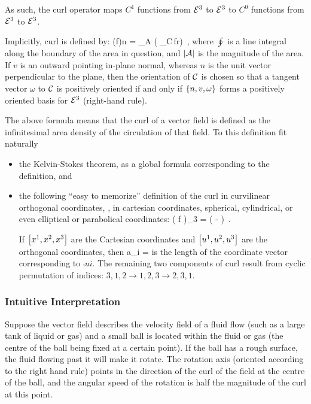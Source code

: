 As such, the curl operator maps $C^1$ functions from $\mathcal{E}^{3}$ to $\mathcal{E}^{3}$ to $C^0$ functions from $\mathcal{E}^{3}$ to $\mathcal{E}^{3}$.

Implicitly, curl is defined by:
\beq
(\gder\cprod f)\iprod n = \lim_{\surf A} \left(  \oint_{\curve C}\,f\iprod\dx r\right) \,,
\eeq
where $\oint$ is a line integral along the boundary of the area in question, and $\lvert{\mathcal{A}}\rvert$ is the magnitude of the area. If $v$ is an outward pointing in-plane normal, whereas $n$ is the unit vector perpendicular to the plane, then the orientation of $\mathcal{C}$ is chosen so that a tangent vector $\omega$ to $\mathcal{C}$ is positively oriented if and only if $\left\lbrace{n, v,\omega}\right\rbrace$ forms a positively oriented basis for $\mathcal{E}^{3}$ (right-hand rule).

The above formula means that the curl of a vector field is defined as the infinitesimal area density of the circulation of that field. To this definition fit naturally
\begin{itemize}
\item the Kelvin-Stokes theorem, as a global formula corresponding to the definition, and
%
\item the following ``easy to memorize'' definition of the curl in curvilinear orthogonal coordinates, \eg, in cartesian coordinates, spherical, cylindrical, or even elliptical or parabolical coordinates:
\beq
\left( \curl f \right)_{3} =  \left(  -  \right) \,.
\eeq

If $\left[{{x}^{1}, {x}^{2}, {x}^{3}}\right]$ are the Cartesian coordinates and $\left[{{u}^{1}, {u}^{2}, {u}^{3}}\right]$ are the orthogonal coordinates, then
\beq
a_i = 
\eeq
is the length of the coordinate vector corresponding to $\comp ui$. The remaining two components of curl result from cyclic permutation of indices: $3,1,2\to 1,2,3\to 2,3,1$.
\end{itemize}


\subsubsection{Intuitive Interpretation}
Suppose the vector field describes the velocity field of a fluid flow (such as a large tank of liquid or gas) and a small ball is located within the fluid or gas (the centre of the ball being fixed at a certain point). If the ball has a rough surface, the fluid flowing past it will make it rotate. The rotation axis (oriented according to the right hand rule) points in the direction of the curl of the field at the centre of the ball, and the angular speed of the rotation is half the magnitude of the curl at this point.


